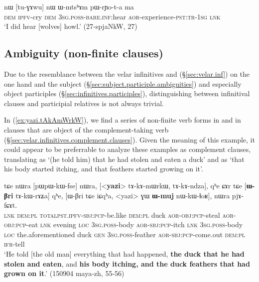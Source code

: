 \begin{exe}
\ex \label{ex:tuGAwu.nW.WmtshAm}
\gll nɯ [tu-ɣɤwu] nɯ ɯ-mtsʰɤm pɯ-rɲo-t-a ma  \\
\textsc{dem} \textsc{ipfv}-cry \textsc{dem} \textsc{3sg}.\textsc{poss}-\textsc{bare}.\textsc{inf}:hear \textsc{aor}-experience-\textsc{pst}:\textsc{tr}-\textsc{1sg} \textsc{lnk} \\
\glt `I did hear [wolves] howl.' (27-spjaNkW, 27)
\end{exe}

\subsection{Ambiguity (non-finite clauses)} \label{sec:non-finite.relative.complement.ambiguity}
Due to the resemblance between the velar infinitives  and  (§\ref{sec:velar.inf}) on the one hand and the subject (§\ref{sec:subject.participle.ambiguities}) and especially object participles (§\ref{sec:infinitives.participles}), distinguishing between infinitival clauses and participial relatives is not always trivial.

In (\ref{ex:yazi.tAkAmWrkW}), we find a series of non-finite verb forms in  and  in clauses that are object of the complement-taking verb  (§\ref{sec:velar.infinitives.complement.clauses}). Given the meaning of this example, it could appear to be preferrable to analyze these examples as complement clauses, translating  as `(he told him) that he had stolen and eaten a duck' and  as `that his body started itching, and that feathers started growing on it'. 

\begin{exe}
\ex \label{ex:yazi.tAkAmWrkW}
\gll tɕe nɯra [pɯ\redp{}pɯ-kɯ-fse] nɯra, [<\textbf{yazi}> tɤ-kɤ-mɯrkɯ, tɤ-kɤ-ndza], qʰe ɕɤr tɕe [\textbf{ɯ-βri} tɤ-kɯ-rɤʑa] qʰe, [ɯ-βri tɕe iɕqʰa, <yazi> ɣɯ \textbf{ɯ-muj} nɯ-kɯ-ɬoʁ], nɯra pjɤ-fɕɤt. \\
\textsc{lnk} \textsc{dem}:\textsc{pl} \textsc{total}\redp{}\textsc{pst}.\textsc{ipfv}-\textsc{sbj}:\textsc{pcp}-be.like \textsc{dem}:\textsc{pl}  duck \textsc{aor}-\textsc{obj}:\textsc{pcp}-steal \textsc{aor}-\textsc{obj}:\textsc{pcp}-eat \textsc{lnk} evening \textsc{loc} \textsc{3sg}.\textsc{poss}-body \textsc{aor}-\textsc{sbj}:\textsc{pcp}-itch \textsc{lnk}   \textsc{3sg}.\textsc{poss}-body \textsc{loc} the.aforementioned duck \textsc{gen} \textsc{3sg}.\textsc{poss}-feather \textsc{aor}-\textsc{sbj}:\textsc{pcp}-come.out \textsc{dem}:\textsc{pl} \textsc{ifr}-tell \\
\glt `He told [the old man] everything that had happened, \textbf{the duck that he had stolen and eaten}, and \textbf{his body itching, and the duck feathers that had grown on it}.' (150904 maya-zh, 55-56)
 \end{exe}


